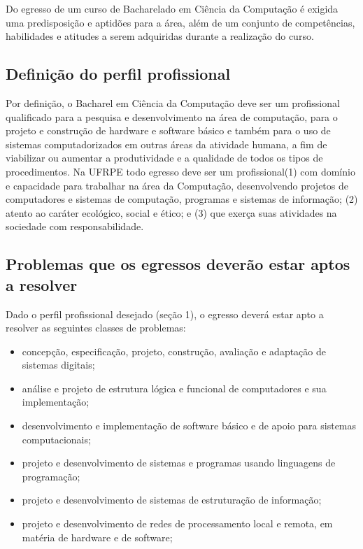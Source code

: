 \documentclass[
	12pt,				%
	openright,			%
  oneside,     %
	a4paper,			%
	english,			%
	french,				%
	spanish,			%
	brazil				%
	]{abntex2}
\begin{document}
Do egresso de um curso de Bacharelado em Ciência da Computação é exigida uma
predisposição e aptidões para a área, além de um conjunto de competências, 
habilidades e atitudes a serem adquiridas durante a realização do curso.

\subsection{Definição do perfil profissional}

Por definição, o Bacharel em Ciência da Computação deve ser um profissional 
qualificado para a pesquisa e desenvolvimento na área de computação, para  o
projeto e construção de hardware e software básico e também para o uso de 
sistemas computadorizados em outras áreas da atividade humana, a fim de
viabilizar  ou aumentar a produtividade e a qualidade de todos os tipos de
procedimentos.  Na UFRPE todo egresso deve ser um profissional(1)  com domínio e
capacidade para trabalhar na área da Computação, desenvolvendo projetos de
computadores  e sistemas de computação, programas e sistemas de informação; (2)
atento  ao caráter ecológico, social e ético; e (3) que exerça suas atividades
na  sociedade com responsabilidade.

\subsection{Problemas que os egressos deverão estar aptos a resolver}

Dado o perfil profissional desejado (seção 1), o egresso deverá estar apto a resolver as seguintes classes de problemas: 

\begin{itemize}
  \item concepção, especificação, projeto, construção, avaliação e adaptação de sistemas digitais; 
  \item análise e projeto de estrutura lógica e funcional de computadores e sua
implementação;
  \item desenvolvimento e implementação de software básico e de apoio para
  sistemas computacionais;
  \item projeto e desenvolvimento de sistemas e programas usando linguagens de
  programação;
  \item projeto e desenvolvimento de sistemas de estruturação de informação; 
  \item projeto e desenvolvimento de redes de processamento local e remota, em
  matéria de hardware e de software;
\end{itemize}
\end{document}
